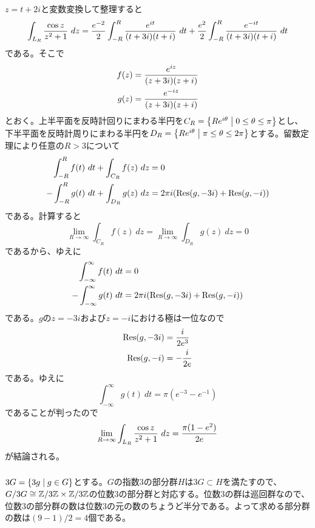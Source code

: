 \newpage

\subsubsection{}%
\begin{sol}
  $z = t + 2i$と変数変換して整理すると
  \[
  \int_{L_R} \frac{\cos z}{z^2 + 1} \ dz = \frac{e^{-2}}{2} \int_{-R}^{R} \frac{ e^{it} }{ (t+3i)(t+i) } \ dt + \frac{e^{2}}{2} \int_{-R}^{R} \frac{ e^{-it} }{ (t+3i)(t+i) } \ dt
  \]
  である。そこで
  \begin{align*}
    f(z) &= \frac{ e^{iz} }{ (z+3i)(z+i) } \\
    g(z) &= \frac{ e^{-iz} }{ (z+3i)(z+i) }
  \end{align*}
  とおく。上半平面を反時計回りにまわる半円を$C_R = \left\{ Re^{i{\theta}}  \mathrel{} \middle| \mathrel{} 0 \leq {\theta} \leq \pi \right\}$とし、下半平面を反時計周りにまわる半円を$D_R = \left\{  Re^{i{\theta}}  \mathrel{} \middle| \mathrel{}  \pi \leq {\theta} \leq 2\pi \right\}$とする。留数定理により任意の$R>3$について
  \begin{align*}
    \int_{-R}^R f(t) \ dt + \int_{C_R} f(z) \ dz &= 0 \\
    - \int_{-R}^R g(t) \ dt + \int_{D_R} g(z) \ dz &= 2\pi i (\operatorname{Res} (g,-3i) + \operatorname{Res}(g, -i))
    \end{align*}
    である。計算すると
    \[
    \lim_{R \to \infty} \int_{C_R} f(z) \ dz = \lim_{R \to \infty} \int_{D_R} g(z) \ dz = 0
    \]
    であるから、ゆえに
\begin{align*}
  \int_{- \infty}^{\infty} f(t) \ dt  &= 0 \\
  - \int_{-\infty}^{\infty} g(t) \ dt  &= 2\pi i (\operatorname{Res} (g,-3i) + \operatorname{Res}(g, -i))
\end{align*}
である。$g$の$z = -3i$および$z=-i$における極は一位なので
\begin{align*}
  \operatorname{Res} (g,-3i) &= \frac{i}{2e^3} \\
  \operatorname{Res}(g, -i) &=  - \frac{i}{2e}
\end{align*}
である。ゆえに
\[
\int_{-\infty}^{\infty} g(t) \ dt = \pi (e^{-3} - e^{-1})
\]
であることが判ったので
\[
\lim_{R \to \infty} \int_{L_R} \frac{\cos z}{z^2 + 1} \ dz = \frac{ \pi(1-e^2) }{2e}
\]
が結論される。
\end{sol}

\newpage


\subsubsection{}%
\begin{sol}
  $3G = \left\{ 3g \mathrel{} \middle| \mathrel{} g \in G \right\}$とする。$G$の指数$3$の部分群$H$は$3G \subset H$を満たすので、$G/3G \cong \mathbb{Z} / 3 \mathbb{Z} \times \mathbb{Z} / 3 \mathbb{Z}$の位数$3$の部分群と対応する。位数$3$の群は巡回群なので、位数$3$の部分群の数は位数$3$の元の数のちょうど半分である。よって求める部分群の数は$(9-1)/2 = 4$個である。
\end{sol}

